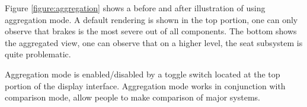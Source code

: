  
Figure \ref{figure:aggregation} shows a before and after illustration of using
aggregation mode. A default rendering is shown in the top portion, one can
only observe that brakes is the most severe out of all components. The bottom
shows the aggregated view, one can observe that on a higher level, the seat
subsystem is quite problematic.
 
Aggregation mode is enabled/disabled by a toggle switch located at the top
portion of the display interface. Aggregation mode works in
conjunction with comparison mode, allow people to make comparison of major
systems.
